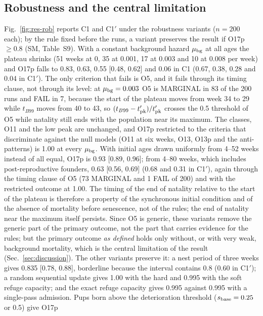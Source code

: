\subsection{Robustness and the central limitation}
\label{sec:res-robustness}

Fig.~\ref{fig:res-rob} reports \textsf{C1} and \textsf{C1}$'$ under the robustness variants ($n=200$ each); by the rule fixed before the runs, a variant preserves the result if O17p $\ge0.8$ (SM,
Table~S9). With a constant background hazard $\mu_{\rm bg}$ at all ages the plateau shrinks (51 weeks at 0, 35 at
0.001, 17 at 0.003 and 10 at 0.008 per week) and O17p falls to 0.83, 0.63, 0.55 [0.48, 0.62] and 0.06 in
\textsf{C1} (0.67, 0.38, 0.28 and 0.04 in \textsf{C1}$'$). The only criterion that fails is O5, and it fails
through its timing clause, not through its level: at $\mu_{\rm bg}=0.003$ O5 is MARGINAL in 83 of the 200 runs
and FAIL in 7, because the start of the plateau moves from week 34 to 29 while $t_{B99}$ moves from 40 to 43, so
$(t_{B99}-t'_{\rm pk})/t'_{\rm pk}$ crosses the 0.5 threshold of O5 while natality still ends with the population
near its maximum. The classes, O11 and the low peak are unchanged, and O17p restricted to the criteria that
discriminate against the null models (O11 at six weeks, O13, O13p and the anti-patterns) is 1.00 at every
$\mu_{\rm bg}$. With initial ages drawn uniformly from 4--52 weeks instead of all equal, O17p is 0.93 [0.89, 0.96];
from 4--80 weeks, which includes post-reproductive founders, 0.63 [0.56, 0.69] (0.68 and 0.31 in \textsf{C1}$'$),
again through the timing clause of O5 (73 MARGINAL and 1 FAIL of 200) and with the restricted outcome at 1.00. The
timing of the end of natality relative to the start of the plateau is therefore a property of the synchronous
initial condition and of the absence of mortality before senescence, not of the rules; the end of natality near
the maximum itself persists. Since O5 is generic, these variants remove the generic part of the primary outcome,
not the part that carries evidence for the rules; but the primary outcome \emph{as defined} holds only without,
or with very weak, background mortality, which is the central limitation of the result
(Sec.~\ref{sec:discussion}). The other variants preserve it: a nest period of three weeks gives 0.835 [0.78, 0.88],
borderline because the interval contains 0.8 (0.60 in \textsf{C1}$'$); a random sequential update gives 1.00 with
the hard and 0.995 with the soft refuge capacity; and the exact refuge capacity gives 0.995 against 0.995 with a
single-pass admission. Pups born above the deterioration threshold ($s_{\rm base}=0.25$ or 0.5) give O17p
